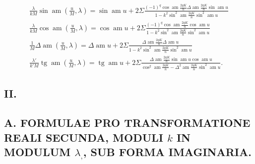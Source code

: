 \documentclass{article}
\begin{document}
\[
\begin{gathered}
\frac{\lambda}{kM}\sin\operatorname{am}\left(\frac{u}{M},\lambda\right)=\sin\operatorname{am}u+2\Sigma\frac{(-1)^{q}\cos\operatorname{am}\frac{2qK}{n}\Delta\operatorname{am}\frac{2qK}{n}\sin\operatorname{am}u}{1-k^{2}\sin^{2}\operatorname{am}\frac{2qK}{n}\sin^{2}\operatorname{am}u}\\[2.5ex]
\frac{\lambda}{kM}\cos\operatorname{am}\left(\frac{u}{M},\lambda\right)=\cos\operatorname{am}u+2\Sigma\frac{(-1)^{q}\cos\operatorname{am}\frac{2qK}{n}\cos\operatorname{am}u}{1-k^{2}\sin^{2}\operatorname{am}\frac{2qK}{n}\sin^{2}\operatorname{am}u}\\[2.5ex]
\frac{1}{M}\Delta\operatorname{am}\left(\frac{u}{M},\lambda\right)=\Delta\operatorname{am}u+2\Sigma\frac{\Delta\operatorname{am}\frac{2qK}{n}\Delta\operatorname{am}u}{1-k^{2}\sin^{2}\operatorname{am}\frac{2qK}{n}\sin^{2}\operatorname{am}u}\\[2.5ex]
\frac{\lambda'}{k'M}\operatorname{tg}\operatorname{am}\left(\frac{u}{M},\lambda\right)=\operatorname{tg}\operatorname{am}u+2\Sigma\frac{\Delta\operatorname{am}\frac{2qK}{n}\sin\operatorname{am}u\cos\operatorname{am}u}{\cos^{2}\operatorname{am}\frac{2qK}{n}-\Delta^{2}\operatorname{am}\frac{2qK}{n}\sin^{2}\operatorname{am}u}.
\end{gathered}
\]

\subsection*{II.}

\subsection*{A. FORMULAE PRO TRANSFORMATIONE REALI SECUNDA, MODULI $k$ IN MODULUM $\lambda_{,}$, SUB FORMA IMAGINARIA.}
\end{document}
